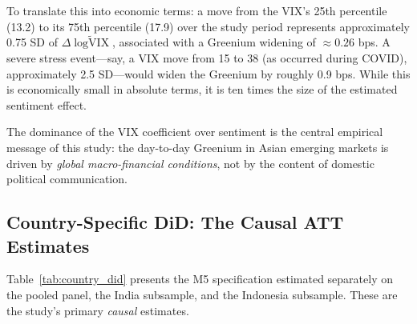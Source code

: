 \documentclass[12pt,a4paper]{article}
\begin{document}
To translate this into economic terms: a move from the VIX's 25th percentile (13.2) to its 75th percentile (17.9) over the study period represents approximately 0.75 SD of $\Delta\widetilde{\log\text{VIX}}$, associated with a Greenium widening of $\approx 0.26$ bps. A severe stress event---say, a VIX move from 15 to 38 (as occurred during COVID), approximately 2.5 SD---would widen the Greenium by roughly 0.9 bps. While this is economically small in absolute terms, it is ten times the size of the estimated sentiment effect.

The dominance of the VIX coefficient over sentiment is the central empirical message of this study: the day-to-day Greenium in Asian emerging markets is driven by \textit{global macro-financial conditions}, not by the content of domestic political communication.

\subsection{Country-Specific DiD: The Causal ATT Estimates}

Table~\ref{tab:country_did} presents the M5 specification estimated separately on the pooled panel, the India subsample, and the Indonesia subsample. These are the study's primary \textit{causal} estimates.
\end{document}
